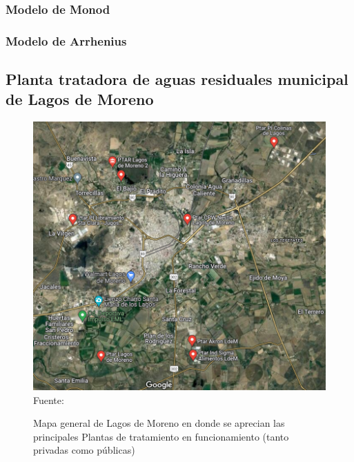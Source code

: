 \subsubsection{Modelo de Monod}
\subsubsection{Modelo de Arrhenius}
\subsection{Planta tratadora de aguas residuales municipal de Lagos de Moreno}
\begin{figure}[H]
	\centering
	\includegraphics[scale=0.6]{../Images/PTARs_Lagos.png}
	\\\small{Fuente: \cite{Maps}}
	\caption{Mapa general de Lagos de Moreno en donde se aprecian las principales Plantas de tratamiento en funcionamiento (tanto privadas como públicas)}\label{fig:lgsptars}
\end{figure}
